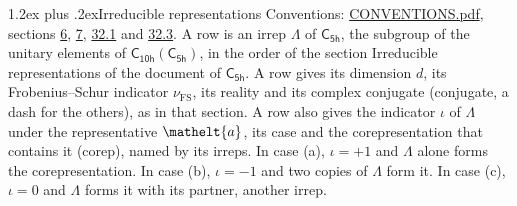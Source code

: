 \documentclass[10pt,a4paper]{article}
\makeatletter
\renewcommand\section{\@startsection{section}{1}{\z@}{-3ex plus -1ex minus -.2ex}%
  {1.2ex plus .2ex}{\normalfont\large\sffamily\bfseries\color{parttitle}}}
\numberwithin{equation}{section}
\newcommand{\eltfont}[1]{{\let\sigma\eltsigma\mathelt{#1}}}
\newcommand{\grp}[1]{\mathsf{#1}}
\newcommand{\elt}[1]{\eltfont{#1}}
\newcommand{\fsind}{\nu_{\mathrm{FS}}}
\makeatother
\begin{document}
\section{Irreducible representations}\label{s:irreps}
Conventions: \href{../../CONVENTIONS.pdf}{CONVENTIONS.pdf}, sections \href{../../../rotation/CONVENTIONS.pdf\#conv.6}{6}, \href{../../../rotation/CONVENTIONS.pdf\#conv.7}{7}, \href{../../CONVENTIONS.pdf\#conv.32.1}{32.1} and \href{../../CONVENTIONS.pdf\#conv.32.3}{32.3}.
\leavevmode\label{n:irrep.Delta}A row is an irrep $\Lambda$ of $\grp{C_{5h}}$, the subgroup of the unitary elements of $\grp{C_{10h}}(\grp{C_{5h}})$, in the order of the section Irreducible representations of the document of \href{../../../rotation/data/pdf/C5h.pdf}{$\grp{C_{5h}}$}. \label{n:index.dimension}\label{n:index.frobenius}\label{n:head.irrep}\label{n:head.reality}\label{n:head.conjugate}A row gives its dimension $d$, its Frobenius--Schur indicator $\fsind$, its reality and its complex conjugate (conjugate, a dash for the others), as in that section. \label{n:head.case.corep}\label{n:head.corep}A row also gives the indicator $\iota$ of $\Lambda$ under the representative $\elt{a}$, its case and the corepresentation that contains it (corep), named by its irreps. In case (a), $\iota = +1$ and $\Lambda$ alone forms the corepresentation. In case (b), $\iota = -1$ and two copies of $\Lambda$ form it. In case (c), $\iota = 0$ and $\Lambda$ forms it with its partner, another irrep.
\setlength{\emergencystretch}{2em}\par\setlength{\emergencystretch}{0pt}
\end{document}
